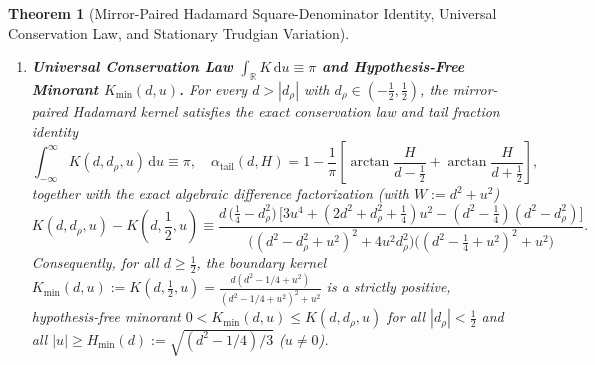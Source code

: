 \documentclass[11pt,reqno]{amsart}
\newtheorem{theorem}{Theorem}[section]
\theoremstyle{definition}
\theoremstyle{remark}
\numberwithin{equation}{section}
\newcommand{\R}{\mathbb{R}}
\newcommand{\dd}{\mathrm{d}}
\begin{document}
\begin{theorem}[Mirror-Paired Hadamard Square-Denominator Identity, Universal Conservation Law, and Stationary Trudgian Variation]
\begin{enumerate}[label=\textup{(\roman*)},leftmargin=2.2em]
\begin{equation}\label{eq:intro_mirror_kernel}
K(d, d_\rho, u) := \frac{1}{2}\left[\frac{d - d_\rho}{(d - d_\rho)^2 + u^2} + \frac{d + d_\rho}{(d + d_\rho)^2 + u^2}\right] \equiv \frac{d\,(d^2 - d_\rho^2 + u^2)}{\bigl(d^2 - d_\rho^2 + u^2\bigr)^2 + 4u^2 d_\rho^2},
\end{equation}
whose denominator $D(d, d_\rho, u) \equiv (d^2 - d_\rho^2 + u^2)^2 + 4u^2 d_\rho^2 \equiv (d^2 + d_\rho^2 + u^2)^2 - 4d^2 d_\rho^2$ is strictly positive for all $u \neq 0$, while $K(d, d_\rho, u) > 0$ for all $d > |d_\rho|$ and all $u \in \R$. Subtracting the finite pure-square prime sum $\Delta B_X(d,t) := \sum_{n=2}^{\lfloor X\rfloor} \Lambda(n)n^{-(1/2+d)}T_K(t\ln n) \ge 0$ leaves the non-negative tail $\mathcal{S}_{+,>X}(d,t) \ge 0$ and reduces the upper budget to $U_{T,X}(d,t) := \sum_{k=1}^K c_k\mathcal{A}(d,kt) + c_0 M(d) - \Delta B_X(d,t)$, pushing the strip threshold
\[
d_{\mathrm{strip},X}^{\mathrm{mirror}}(t) := \inf_{d > 1/2}\sqrt{\max\!\left(0,\, d^2 - \frac{2c_1 d}{U_{T,X}(d,t)}\right)}
\]
monotonically down to $0.000000$ at $t \in \{\gamma_1, \gamma_2, \gamma_3, 60, 100\}$ for $X = 1000$.
\item \textbf{Universal Conservation Law $\int_{\R} K\,\dd u \equiv \pi$ and Hypothesis-Free Minorant $K_{\min}(d,u)$.} For every $d > |d_\rho|$ with $d_\rho \in (-\frac{1}{2}, \frac{1}{2})$, the mirror-paired Hadamard kernel satisfies the exact conservation law and tail fraction identity
\begin{equation}\label{eq:intro_conservation}
\int_{-\infty}^{\infty} K(d, d_\rho, u)\,\dd u \equiv \pi, \quad \alpha_{\mathrm{tail}}(d, H) = 1 - \frac{1}{\pi}\left[\arctan\frac{H}{d - \frac{1}{2}} + \arctan\frac{H}{d + \frac{1}{2}}\right],
\end{equation}
together with the exact algebraic difference factorization (with $W := d^2 + u^2$)
\begin{equation}\label{eq:intro_diff_factor}
K(d, d_\rho, u) - K\!\left(d, \frac{1}{2}, u\right) \equiv \frac{d\,\bigl(\frac{1}{4} - d_\rho^2\bigr)\,\bigl[3u^4 + (2d^2 + d_\rho^2 + \frac{1}{4})u^2 - (d^2 - \frac{1}{4})(d^2 - d_\rho^2)\bigr]}{\bigl((d^2 - d_\rho^2 + u^2)^2 + 4u^2 d_\rho^2\bigr)\bigl((d^2 - \frac{1}{4} + u^2)^2 + u^2\bigr)}.
\end{equation}
Consequently, for all $d \ge \frac{1}{2}$, the boundary kernel $K_{\min}(d,u) := K(d, \frac{1}{2}, u) = \frac{d(d^2 - 1/4 + u^2)}{(d^2 - 1/4 + u^2)^2 + u^2}$ is a strictly positive, hypothesis-free minorant $0 < K_{\min}(d,u) \le K(d, d_\rho, u)$ for all $|d_\rho| < \frac{1}{2}$ and all $|u| \ge H_{\min}(d) := \sqrt{(d^2 - 1/4)/3}$ ($u \neq 0$).

\end{enumerate}
\end{theorem}
\end{document}
